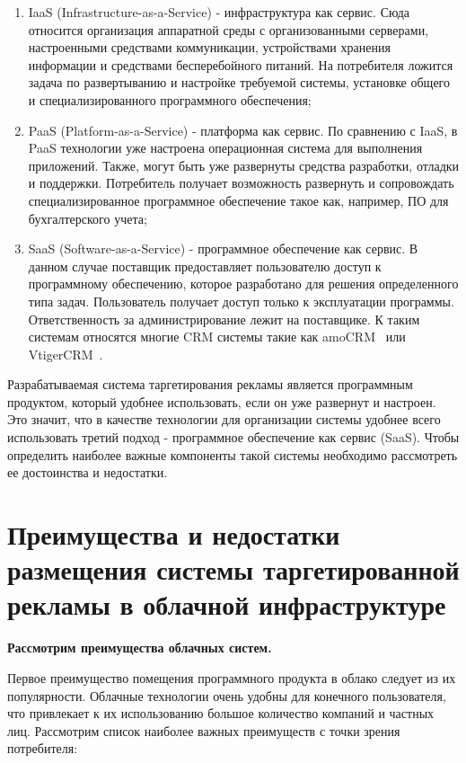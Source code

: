 \begin{enumerate}
	\item IaaS (Infrastructure-as-a-Service) - инфраструктура как сервис.
	Сюда относится организация аппаратной среды с организованными серверами, настроенными средствами коммуникации, устройствами хранения информации и средствами бесперебойного питаний. На потребителя ложится задача по развертыванию и настройке требуемой системы, установке общего и специализированного программного обеспечения;

	\item PaaS (Platform-as-a-Service) - платформа как сервис.
	По сравнению с IaaS, в PaaS технологии уже настроена операционная система для выполнения приложений. Также, могут быть уже развернуты средства разработки, отладки и поддержки. Потребитель получает возможность развернуть и сопровождать специализированное программное обеспечение такое как, например, ПО для бухгалтерского учета;

	\item SaaS (Software-as-a-Service) - программное обеспечение как сервис.
	В данном случае поставщик предоставляет пользователю доступ к программному обеспечению, которое разработано для решения определенного типа задач. Пользователь получает доступ только к эксплуатации программы. Ответственность за администрирование лежит на поставщике. К таким системам относятся многие CRM системы такие как amoCRM~\cite{amoCRMSite} или VtigerCRM~\cite{vtigerSite}.
\end{enumerate}

Разрабатываемая система таргетирования рекламы является программным продуктом, который удобнее использовать, если он уже развернут и настроен. Это значит, что в качестве технологии для организации системы удобнее всего использовать третий подход - программное обеспечение как сервис (SaaS). Чтобы определить наиболее важные компоненты такой системы необходимо рассмотреть ее достоинства и недостатки. 

\section{Преимущества и недостатки размещения системы таргетированной рекламы в облачной инфраструктуре}

\textbf{Рассмотрим преимущества облачных систем.}

Первое преимущество помещения программного продукта в облако следует из их популярности. Облачные технологии очень удобны для конечного пользователя, что привлекает к их использованию большое количество компаний и частных лиц. Рассмотрим список наиболее важных преимуществ с точки зрения потребителя:

